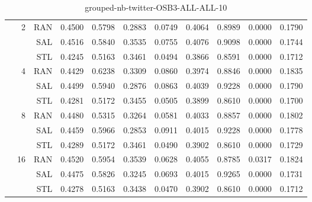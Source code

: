 \begin{center}
\begin{table}[htbp]
\begin{tabular}{ | r | r | r | r | r | r | r | r | r | r | r |}
 & \multirow{3}{*}{2} & RAN & 0.4500 & 0.5798 & 0.2883 & 0.0749 & 0.4064 & 0.8989 & 0.0000 & 0.1790\\ \cline{3-11}
 &   & SAL & 0.4516 & 0.5840 & 0.3535 & 0.0755 & 0.4076 & 0.9098 & 0.0000 & 0.1744\\ \cline{3-11}
 &   & STL & 0.4245 & 0.5163 & 0.3461 & 0.0494 & 0.3866 & 0.8591 & 0.0000 & 0.1712\\ \cline{2-11}
 & \multirow{3}{*}{4} & RAN & 0.4429 & 0.6238 & 0.3309 & 0.0860 & 0.3974 & 0.8846 & 0.0000 & 0.1835\\ \cline{3-11}
 &   & SAL & 0.4499 & 0.5940 & 0.2876 & 0.0863 & 0.4039 & 0.9228 & 0.0000 & 0.1790\\ \cline{3-11}
 &   & STL & 0.4281 & 0.5172 & 0.3455 & 0.0505 & 0.3899 & 0.8610 & 0.0000 & 0.1700\\ \cline{2-11}
 & \multirow{3}{*}{8} & RAN & 0.4480 & 0.5315 & 0.3264 & 0.0581 & 0.4033 & 0.8857 & 0.0000 & 0.1802\\ \cline{3-11}
 &   & SAL & 0.4459 & 0.5966 & 0.2853 & 0.0911 & 0.4015 & 0.9228 & 0.0000 & 0.1778\\ \cline{3-11}
 &   & STL & 0.4289 & 0.5172 & 0.3461 & 0.0490 & 0.3902 & 0.8610 & 0.0000 & 0.1729\\ \cline{2-11}
 & \multirow{3}{*}{16} & RAN & 0.4520 & 0.5954 & 0.3539 & 0.0628 & 0.4055 & 0.8785 & 0.0317 & 0.1824\\ \cline{3-11}
 &   & SAL & 0.4475 & 0.5826 & 0.3245 & 0.0693 & 0.4015 & 0.9265 & 0.0000 & 0.1731\\ \cline{3-11}
 &   & STL & 0.4278 & 0.5163 & 0.3438 & 0.0470 & 0.3902 & 0.8610 & 0.0000 & 0.1712\\ \cline{2-11}
\hline
\end{tabular}
\caption{grouped-nb-twitter-OSB3-ALL-ALL-10}
\end{table}
\end{center}


